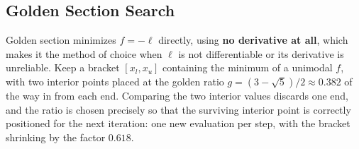 \documentclass[
  letterpaper,
  DIV=11,
  numbers=noendperiod]{scrreprt}
\begin{document}
\subsection{Golden Section Search}\label{golden-section-search}

Golden section minimizes \(f = -\ell\) directly, using \textbf{no
derivative at all}, which makes it the method of choice when \(\ell\) is
not differentiable or its derivative is unreliable. Keep a bracket
\([x_l, x_u]\) containing the minimum of a unimodal \(f\), with two
interior points placed at the golden ratio
\(g = (3 - \sqrt5)/2 \approx 0.382\) of the way in from each end.
Comparing the two interior values discards one end, and the ratio is
chosen precisely so that the surviving interior point is correctly
positioned for the next iteration: one new evaluation per step, with the
bracket shrinking by the factor \(0.618\).
\end{document}
